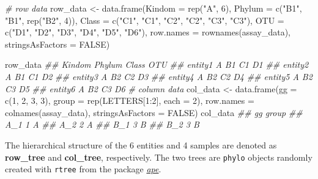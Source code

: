 \documentclass[]{article}
\newcommand{\hlnum}[1]{\textcolor[rgb]{0.816,0.125,0.439}{#1}}%
\newcommand{\hlstr}[1]{\textcolor[rgb]{0.251,0.627,0.251}{#1}}%
\newcommand{\hlcom}[1]{\textcolor[rgb]{0.502,0.502,0.502}{\textit{#1}}}%
\newcommand{\hlopt}[1]{\textcolor[rgb]{0,0,0}{#1}}%
\newcommand{\hlstd}[1]{\textcolor[rgb]{0.251,0.251,0.251}{#1}}%
\newcommand{\hlkwc}[1]{\textcolor[rgb]{0.251,0.251,0.251}{#1}}%
\newcommand{\hlkwd}[1]{\textcolor[rgb]{0.878,0.439,0.125}{#1}}%
\newenvironment{Shaded}{\begin{myshaded}}{\end{myshaded}}
\newcommand{\KeywordTok}[1]{\hlkwd{#1}}
\newcommand{\DataTypeTok}[1]{\hlkwc{#1}}
\newcommand{\DecValTok}[1]{\hlnum{#1}}
\newcommand{\StringTok}[1]{\hlstr{#1}}
\newcommand{\CommentTok}[1]{\hlcom{#1}}
\newcommand{\OtherTok}[1]{{#1}}
\newcommand{\OperatorTok}[1]{\hlopt{#1}}
\newcommand{\NormalTok}[1]{\hlstd{#1}}
\begin{document}
\begin{Shaded}
\begin{Highlighting}[]
\CommentTok{# row data}
\NormalTok{row_data <-}\StringTok{ }\KeywordTok{data.frame}\NormalTok{(}\DataTypeTok{Kindom =} \KeywordTok{rep}\NormalTok{(}\StringTok{"A"}\NormalTok{, }\DecValTok{6}\NormalTok{),}
                     \DataTypeTok{Phylum =} \KeywordTok{c}\NormalTok{(}\StringTok{"B1"}\NormalTok{, }\StringTok{"B1"}\NormalTok{, }\KeywordTok{rep}\NormalTok{(}\StringTok{"B2"}\NormalTok{, }\DecValTok{4}\NormalTok{)),}
                     \DataTypeTok{Class =} \KeywordTok{c}\NormalTok{(}\StringTok{"C1"}\NormalTok{, }\StringTok{"C1"}\NormalTok{, }\StringTok{"C2"}\NormalTok{, }\StringTok{"C2"}\NormalTok{, }\StringTok{"C3"}\NormalTok{, }\StringTok{"C3"}\NormalTok{),}
                     \DataTypeTok{OTU =} \KeywordTok{c}\NormalTok{(}\StringTok{"D1"}\NormalTok{, }\StringTok{"D2"}\NormalTok{, }\StringTok{"D3"}\NormalTok{, }\StringTok{"D4"}\NormalTok{, }\StringTok{"D5"}\NormalTok{, }\StringTok{"D6"}\NormalTok{),}
                     \DataTypeTok{row.names =} \KeywordTok{rownames}\NormalTok{(assay_data),}
                     \DataTypeTok{stringsAsFactors =} \OtherTok{FALSE}\NormalTok{)}

\NormalTok{row_data}
\CommentTok{##         Kindom Phylum Class OTU}
\CommentTok{## entity1      A     B1    C1  D1}
\CommentTok{## entity2      A     B1    C1  D2}
\CommentTok{## entity3      A     B2    C2  D3}
\CommentTok{## entity4      A     B2    C2  D4}
\CommentTok{## entity5      A     B2    C3  D5}
\CommentTok{## entity6      A     B2    C3  D6}
\CommentTok{# column data}
\NormalTok{col_data <-}\StringTok{ }\KeywordTok{data.frame}\NormalTok{(}\DataTypeTok{gg =} \KeywordTok{c}\NormalTok{(}\DecValTok{1}\NormalTok{, }\DecValTok{2}\NormalTok{, }\DecValTok{3}\NormalTok{, }\DecValTok{3}\NormalTok{),}
                    \DataTypeTok{group =} \KeywordTok{rep}\NormalTok{(LETTERS[}\DecValTok{1}\OperatorTok{:}\DecValTok{2}\NormalTok{], }\DataTypeTok{each =} \DecValTok{2}\NormalTok{), }
                    \DataTypeTok{row.names =} \KeywordTok{colnames}\NormalTok{(assay_data),}
                     \DataTypeTok{stringsAsFactors =} \OtherTok{FALSE}\NormalTok{)}
\NormalTok{col_data}
\CommentTok{##     gg group}
\CommentTok{## A_1  1     A}
\CommentTok{## A_2  2     A}
\CommentTok{## B_1  3     B}
\CommentTok{## B_2  3     B}
\end{Highlighting}
\end{Shaded}

The hierarchical structure of the 6 entities and 4 samples are denoted as
\textbf{row\_tree} and \textbf{col\_tree}, respectively. The two trees are \texttt{phylo} objects randomly created with \texttt{rtree} from the package \emph{\href{https://CRAN.R-project.org/package=ape}{ape}}.
\end{document}
